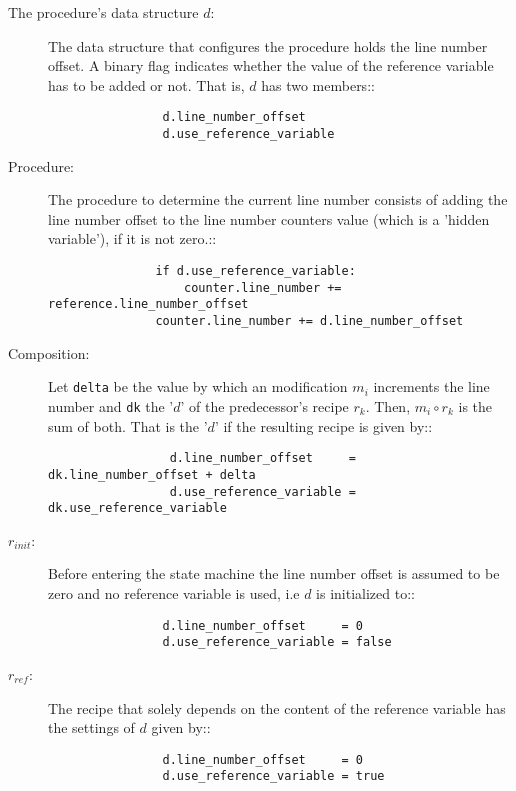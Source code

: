 \documentclass[12pt,a4paper]{scrartcl}
\begin{document}
\begin{description}
    \item[The procedure's data structure $d$:] The data structure that configures
        the procedure holds the line number offset. A binary flag indicates whether
        the value of the reference variable has to be added or not. That is, $d$
        has two members::

        \begin{verbatim}
                d.line_number_offset
                d.use_reference_variable
        \end{verbatim}
        
    \item[Procedure:] The procedure to determine the current line number
        consists of adding the line number offset to the line number
        counters value (which is a 'hidden variable'), if it is not zero.::

        \begin{verbatim}
               if d.use_reference_variable:
                   counter.line_number += reference.line_number_offset 
               counter.line_number += d.line_number_offset 
        \end{verbatim}

   \item[Composition:] Let \verb/delta/ be the value by which an modification
       $m_i$ increments the line number and \verb/dk/ the '$d$' of the
       predecessor's recipe $r_k$.  Then, $m_i\circ r_k$ is the sum of both.
       That is the '$d$' if the resulting recipe is given by::

        \begin{verbatim}
                 d.line_number_offset     = dk.line_number_offset + delta
                 d.use_reference_variable = dk.use_reference_variable
        \end{verbatim}

   \item[$r_{init}$:] Before entering the state machine the line number offset
        is assumed to be zero and no reference variable is used, i.e $d$ is
        initialized to::

        \begin{verbatim}
                d.line_number_offset     = 0
                d.use_reference_variable = false
        \end{verbatim}

   \item[$r_{ref}$:] The recipe that solely depends on the content of the
       reference variable has the settings of $d$ given by::

        \begin{verbatim}
                d.line_number_offset     = 0
                d.use_reference_variable = true
        \end{verbatim}
\end{description}
\end{document}
